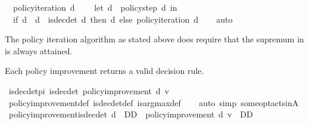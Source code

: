 \begin{isabellebody}
\ \ {\isachardoublequoteopen}policy{\isacharunderscore}{\kern0pt}iteration\ d\ {\isacharequal}{\kern0pt}\ {\isacharparenleft}{\kern0pt}\isanewline
\ \ let\ d{\isacharprime}{\kern0pt}\ {\isacharequal}{\kern0pt}\ policy{\isacharunderscore}{\kern0pt}step\ d\ in\isanewline
\ \ if\ d\ {\isacharequal}{\kern0pt}\ d{\isacharprime}{\kern0pt}\ {\isasymor}\ {\isasymnot}is{\isacharunderscore}{\kern0pt}dec{\isacharunderscore}{\kern0pt}det\ d\ then\ d\ else\ policy{\isacharunderscore}{\kern0pt}iteration\ d{\isacharprime}{\kern0pt}{\isacharparenright}{\kern0pt}{\isachardoublequoteclose}\isanewline
%
\isadelimproof
\ \ %
\endisadelimproof
%
\isatagproof
{}\isamarkupfalse%
\ auto%
\endisatagproof
{\isafoldproof}%
%
\isadelimproof
%
\endisadelimproof
%
\begin{isamarkuptext}%
The policy iteration algorithm as stated above does require that the supremum in  is
always attained.%
\end{isamarkuptext}\isamarkuptrue%
%
\begin{isamarkuptext}%
Each policy improvement returns a valid decision rule.%
\end{isamarkuptext}\isamarkuptrue%
\isamarkupfalse%
\ is{\isacharunderscore}{\kern0pt}dec{\isacharunderscore}{\kern0pt}det{\isacharunderscore}{\kern0pt}pi{\isacharcolon}{\kern0pt}\ {\isachardoublequoteopen}is{\isacharunderscore}{\kern0pt}dec{\isacharunderscore}{\kern0pt}det\ {\isacharparenleft}{\kern0pt}policy{\isacharunderscore}{\kern0pt}improvement\ d\ v{\isacharparenright}{\kern0pt}{\isachardoublequoteclose}\isanewline
%
\isadelimproof
\ \ %
\endisadelimproof
%
\isatagproof
{}\isamarkupfalse%
\ policy{\isacharunderscore}{\kern0pt}improvement{\isacharunderscore}{\kern0pt}def\ is{\isacharunderscore}{\kern0pt}dec{\isacharunderscore}{\kern0pt}det{\isacharunderscore}{\kern0pt}def\ is{\isacharunderscore}{\kern0pt}arg{\isacharunderscore}{\kern0pt}max{\isacharunderscore}{\kern0pt}def\isanewline
\ \ \isamarkupfalse%
\ {\isacharparenleft}{\kern0pt}auto\ simp{\isacharcolon}{\kern0pt}\ some{\isacharunderscore}{\kern0pt}opt{\isacharunderscore}{\kern0pt}acts{\isacharunderscore}{\kern0pt}in{\isacharunderscore}{\kern0pt}A{\isacharparenright}{\kern0pt}%
\endisatagproof
{\isafoldproof}%
%
\isadelimproof
\isanewline
%
\endisadelimproof
\isanewline
{}\isamarkupfalse%
\ policy{\isacharunderscore}{\kern0pt}improvement{\isacharunderscore}{\kern0pt}is{\isacharunderscore}{\kern0pt}dec{\isacharunderscore}{\kern0pt}det{\isacharcolon}{\kern0pt}\ {\isachardoublequoteopen}d\ {\isasymin}\ D\isactrlsub D\ {\isasymLongrightarrow}\ policy{\isacharunderscore}{\kern0pt}improvement\ d\ v\ {\isasymin}\ D\isactrlsub D{\isachardoublequoteclose}\isanewline

\end{isabellebody}
